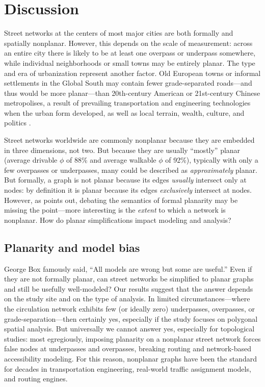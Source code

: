 \documentclass[Afour,sageh,times]{sagej}
\begin{document}
\section{Discussion}

Street networks at the centers of most major cities are both formally and spatially nonplanar. However, this depends on the scale of measurement: across an entire city there is likely to be at least one overpass or underpass somewhere, while individual neighborhoods or small towns may be entirely planar. The type and era of urbanization represent another factor. Old European towns or informal settlements in the Global South may contain fewer grade-separated roads---and thus would be more planar---than 20th-century American or 21st-century Chinese metropolises, a result of prevailing transportation and engineering technologies when the urban form developed, as well as local terrain, wealth, culture, and politics \citep{southworth_street_1995}.

Street networks worldwide are commonly nonplanar because they are embedded in three dimensions, not two. But because they are usually \enquote{mostly} planar (average drivable $\phi$ of 88\% and average walkable $\phi$ of 92\%), typically with only a few overpasses or underpasses, many could be described as \emph{approximately} planar. But formally, a graph is not planar because its edges \emph{usually} intersect only at nodes: by definition it is planar because its edges \emph{exclusively} intersect at nodes. However, as \citet{newman_networks:_2010} points out, debating the semantics of formal planarity may be missing the point---more interesting is the \emph{extent} to which a network is nonplanar. How do planar simplifications impact modeling and analysis?

\subsection{Planarity and model bias}

George Box famously said, \enquote{All models are wrong but some are useful.} Even if they are not formally planar, can street networks be simplified to planar graphs and still be usefully well-modeled? Our results suggest that the answer depends on the study site and on the type of analysis. In limited circumstances---where the circulation network exhibits few (or ideally zero) underpasses, overpasses, or grade-separation---then certainly yes, especially if the study focuses on polygonal spatial analysis. But universally we cannot answer yes, especially for topological studies: most egregiously, imposing planarity on a nonplanar street network forces false nodes at underpasses and overpasses, breaking routing and network-based accessibility modeling. For this reason, nonplanar graphs have been the standard for decades in transportation engineering, real-world traffic assignment models, and routing engines.
\end{document}
